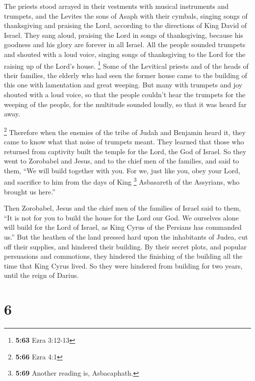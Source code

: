  The priests stood arrayed in their vestments with
musical instruments and trumpets, and the Levites the sons of Asaph with
their cymbals,  singing songs of thanksgiving and
praising the Lord, according to the directions of King David of Israel.
 They sang aloud, praising the Lord in songs of
thanksgiving, because his goodness and his glory are forever in all
Israel.  All the people sounded trumpets and shouted with
a loud voice, singing songs of thanksgiving to the Lord for the raising
up of the Lord's house.  \footnote{\textbf{5:63} Ezra
  3:12-13} Some of the Levitical priests and of the heads of their
families, the elderly who had seen the former house came to the building
of this one with lamentation and great weeping.  But many
with trumpets and joy shouted with a loud voice,  so that
the people couldn't hear the trumpets for the weeping of the people, for
the multitude sounded loudly, so that it was heard far away.

 \footnote{\textbf{5:66} Ezra 4:1} Therefore when the
enemies of the tribe of Judah and Benjamin heard it, they came to know
what that noise of trumpets meant.  They learned that
those who returned from captivity built the temple for the Lord, the God
of Israel.  So they went to Zorobabel and Jesus, and to
the chief men of the families, and said to them, ``We will build
together with you.  For we, just like you, obey your
Lord, and sacrifice to him from the days of King \footnote{\textbf{5:69}
  Another reading is, Asbacaphath.} Asbasareth of the Assyrians, who
brought us here.''

 Then Zorobabel, Jesus and the chief men of the families
of Israel said to them, ``It is not for you to build the house for the
Lord our God.  We ourselves alone will build for the Lord
of Israel, as King Cyrus of the Persians has commanded us.''
 But the heathen of the land pressed hard upon the
inhabitants of Judea, cut off their supplies, and hindered their
building.  By their secret plots, and popular persuasions
and commotions, they hindered the finishing of the building all the time
that King Cyrus lived. So they were hindered from building for two
years, until the reign of Darius.

\hypertarget{section-5}{%
\section{6}\label{section-5}}

